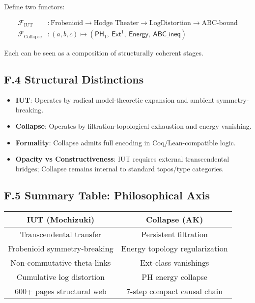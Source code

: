 \documentclass[11pt]{article}
\begin{document}
Define two functors:

\begin{align*}
\mathcal{F}_{\mathrm{IUT}} &: \text{Frobenioid} \to \text{Hodge Theater} \to \text{LogDistortion} \to \text{ABC-bound} \\
\mathcal{F}_{\mathrm{Collapse}} &: (a,b,c) \mapsto \left( \mathsf{PH}_1,\ \mathsf{Ext}^1,\ \mathsf{Energy},\ \mathsf{ABC\_ineq} \right)
\end{align*}

Each can be seen as a composition of structurally coherent stages.

\subsection*{F.4 Structural Distinctions}

\begin{itemize}
  \item \textbf{IUT}: Operates by radical model-theoretic expansion and ambient symmetry-breaking.
  \item \textbf{Collapse}: Operates by filtration-topological exhaustion and energy vanishing.
  \item \textbf{Formality}: Collapse admits full encoding in Coq/Lean-compatible logic.
  \item \textbf{Opacity vs Constructiveness}: IUT requires external transcendental bridges; Collapse remains internal to standard topos/type categories.
\end{itemize}

\subsection*{F.5 Summary Table: Philosophical Axis}

\begin{tabular}{|c|c|}
\hline
\textbf{IUT (Mochizuki)} & \textbf{Collapse (AK)} \\
\hline
Transcendental transfer & Persistent filtration \\
Frobenioid symmetry-breaking & Energy topology regularization \\
Non-commutative theta-links & Ext-class vanishings \\
Cumulative log distortion & PH energy collapse \\
600+ pages structural web & 7-step compact causal chain \\
\hline
\end{tabular}
\end{document}
